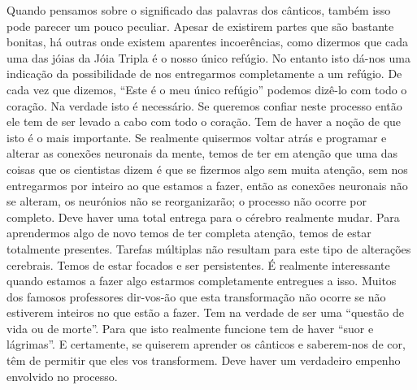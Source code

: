 Quando pensamos sobre o significado das palavras dos cânticos, também
isso pode parecer um pouco peculiar. Apesar de existirem partes que são
bastante bonitas, há outras onde existem aparentes incoerências, como
dizermos que cada uma das jóias da Jóia Tripla é o nosso único refúgio.
No entanto isto dá-nos uma indicação da possibilidade de nos entregarmos
completamente a um refúgio. De cada vez que dizemos, ``Este é o meu
único refúgio'' podemos dizê-lo com todo o coração. Na verdade isto é
necessário. Se queremos confiar neste processo então ele tem de ser
levado a cabo com todo o coração. Tem de haver a noção de que isto é o
mais importante. Se realmente quisermos voltar atrás e programar e
alterar as conexões neuronais da mente, temos de ter em atenção que uma
das coisas que os cientistas dizem é que se fizermos algo sem muita
atenção, sem nos entregarmos por inteiro ao que estamos a fazer, então
as conexões neuronais não se alteram, os neurónios não se reorganizarão;
o processo não ocorre por completo. Deve haver uma total entrega para o
cérebro realmente mudar. Para aprendermos algo de novo temos de ter
completa atenção, temos de estar totalmente presentes. Tarefas múltiplas
não resultam para este tipo de alterações cerebrais. Temos de estar
focados e ser persistentes. É realmente interessante quando estamos a
fazer algo estarmos completamente entregues a isso. Muitos dos famosos
professores dir-vos-ão que esta transformação não ocorre se não
estiverem inteiros no que estão a fazer. Tem na verdade de ser uma
``questão de vida ou de morte''. Para que isto realmente funcione tem de
haver ``suor e lágrimas''. E certamente, se quiserem aprender os
cânticos e saberem-nos de cor, têm de permitir que eles vos transformem.
Deve haver um verdadeiro empenho envolvido no processo.

